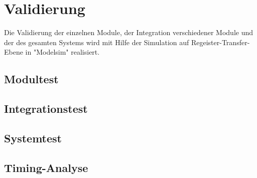 \documentclass{article}
\numberwithin{equation}{section}
\begin{document}
\section{Validierung}
Die Validierung der einzelnen Module, der Integration verschiedener Module und der
des gesamten Systems wird mit Hilfe der Simulation auf Regeister-Transfer-Ebene 
in "Modelsim" realisiert.
\subsection{Modultest}

\subsection{Integrationstest}

\subsection{Systemtest}

\subsection{Timing-Analyse}
\end{document}

